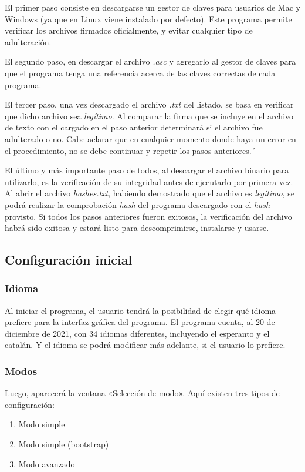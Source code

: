 \documentclass[12pt,a4paper,twoside]{book}
\begin{document}
El primer paso consiste en descargarse un gestor de claves para usuarios de Mac y Windows (ya que en Linux viene instalado por defecto). Este programa permite verificar los archivos firmados oficialmente, y evitar cualquier tipo de adulteración.

El segundo paso, en descargar el archivo \textit{.asc} y agregarlo al gestor de claves para que el programa tenga una referencia acerca de las claves correctas de cada programa.

El tercer paso, una vez descargado el archivo \textit{.txt} del listado, se basa en verificar que dicho archivo sea \textit{legítimo}. Al comparar la firma que se incluye en el archivo de texto con el cargado en el paso anterior determinará si el archivo fue adulterado o no. Cabe aclarar que en cualquier momento donde haya un error en el procedimiento, no se debe continuar y repetir los pasos anteriores.´

El último y más importante paso de todos, al descargar el archivo binario para utilizarlo, es la verificación de su integridad antes de ejecutarlo por primera vez. Al abrir el archivo \textit{hashes.txt}, habiendo demostrado que el archivo es \textit{legítimo}, se podrá realizar la comprobación \textit{hash} del programa descargado con el \textit{hash} provisto. Si todos los pasos anteriores fueron exitosos, la verificación del archivo habrá sido exitosa y estará listo para descomprimirse, instalarse y usarse.

\subsection{Configuración inicial}

\subsubsection{Idioma}
Al iniciar el programa, el usuario tendrá la posibilidad de elegir qué idioma prefiere para la interfaz gráfica del programa. El programa cuenta, al 20 de diciembre de 2021, con 34 idiomas diferentes, incluyendo el esperanto y el catalán. Y el idioma se podrá modificar más adelante, si el usuario lo prefiere.

\subsubsection{Modos}
Luego, aparecerá la ventana «Selección de modo». Aquí existen tres tipos de configuración:

\begin{enumerate}
\item Modo simple
\item Modo simple (bootstrap)
\item Modo avanzado
\end{enumerate}
\end{document}
